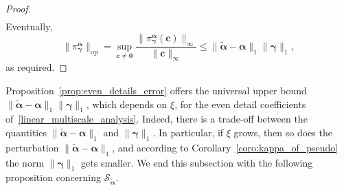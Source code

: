 \documentclass[12pt]{article}
\begin{document}
\begin{proof}
\begin{align*}
    \end{align*}
    Eventually,
    \begin{equation*}
        \|\pi^{\boldsymbol{\alpha}}_{\boldsymbol{\gamma}}\|_{\text{op}} = \sup_{\boldsymbol{c}\neq\boldsymbol{0}}\frac{\|\pi^{\boldsymbol{\alpha}}_{\boldsymbol{\gamma}}(\boldsymbol{c})\|_\infty}{\|\boldsymbol{c}\|_\infty}\leq \|\widetilde{\boldsymbol{\alpha}}-\boldsymbol{\alpha}\|_1 \|\boldsymbol{\gamma}\|_1,
    \end{equation*}
    as required.
\end{proof}

Proposition~\ref{prop:even_details_error} offers the universal upper bound $\|\widetilde{\boldsymbol{\alpha}}-\boldsymbol{\alpha}\|_1 \|\boldsymbol{\gamma}\|_1$, which depends on $\xi$, for the even detail coefficients of~\eqref{linear_multiscale_analysis}. Indeed, there is a trade-off between the quantities $\|\widetilde{\boldsymbol{\alpha}}-\boldsymbol{\alpha}\|_1$ and $\|\boldsymbol{\gamma}\|_1$. In particular, if $\xi$ grows, then so does the perturbation $\|\widetilde{\boldsymbol{\alpha}}-\boldsymbol{\alpha}\|_1$, and according to Corollary~\ref{coro:kappa_of_pseudo} the norm $\|\boldsymbol{\gamma}\|_1$ gets smaller. We end this subsection with the following proposition concerning $\mathcal{S}_{\widetilde{\boldsymbol{\alpha}}}$.
\end{document}
